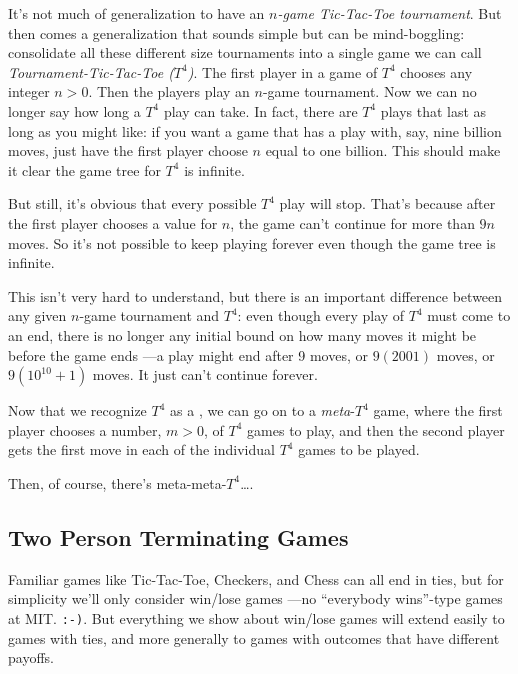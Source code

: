 \begin{definition}
It's not much of generalization to have an \emph{$n$-game Tic-Tac-Toe
  tournament}.  But then comes a generalization that sounds simple but can
be mind-boggling: consolidate all these different size tournaments into a
single game we can call \emph{Tournament-Tic-Tac-Toe ($T^4$)}.  The first
player in a game of $T^4$ chooses any integer $n > 0$.  Then the players
play an $n$-game tournament.  Now we can no longer say how long a $T^4$
play can take.  In fact, there are $T^4$ plays that last as long as you
might like: if you want a game that has a play with, say, nine billion
moves, just have the first player choose $n$ equal to one billion.  This
should make it clear the game tree for $T^4$ is infinite.

But still, it's obvious that every possible $T^4$ play will stop.
That's because after the first player chooses a value for $n$, the
game can't continue for more than $9n$ moves.  So it's not possible to
keep playing forever even though the game tree is infinite.

This isn't very hard to understand, but there is an important
difference between any given $n$-game tournament and $T^4$: even
though every play of $T^4$ must come to an end, there is no longer any
initial bound on how many moves it might be before the game ends ---a
play might end after 9 moves, or $9(2001)$ moves, or $9(10^{10}+1)$
moves.  It just can't continue forever.

Now that we recognize $T^4$ as a \tg, we can go on to
a \emph{meta}-$T^4$ game, where the first player chooses a number,
$m>0$, of $T^4$ games to play, and then the second player gets the
first move in each of the individual $T^4$ games to be played.

Then, of course, there's meta-meta-$T^4$\dots.

\subsection{Two Person Terminating Games}

Familiar games like Tic-Tac-Toe, Checkers, and Chess can all end in
ties, but for simplicity we'll only consider win/lose games ---no
``everybody wins''-type games at MIT. \texttt{:-)}.  But everything we
show about win/lose games will extend easily to games with ties, and
more generally to games with outcomes that have different payoffs.


\end{definition}
